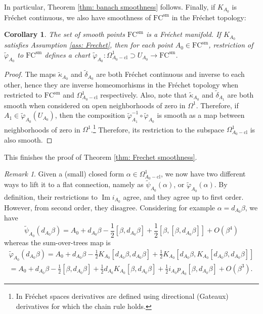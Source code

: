 \documentclass[11pt,a4paper]{amsart}
\theoremstyle{plain} %
\newtheorem{cor}[thm]{Corollary}
\theoremstyle{definition}
\theoremstyle{remark}
\newtheorem{rem}[thm]{Remark}
\newcommand{\dd}{d}
\newcommand{\mr}{\mathrm}
\newcommand{\til}{\widetilde}
\newcommand{\FC}{\mathrm{FC}}
\begin{document}
In particular, Theorem \ref{thm: banach smoothness} follows. 
Finally, if $K_{A_0}$ is Fr\'echet continuous, we also have smoothness of $\FC^\mr{sm}$ in the Fr\'echet topology:   
\begin{cor}\label{cor: Frechet smoothness}
    The set of smooth points $\FC^{\mr{sm}}$ is a Fr\'echet manifold. If $K_{A_0}$ satisfies Assumption \ref{ass: Frechet}, then for each point $A_0 \in \FC^{\mr{sm}}$, restriction of $\til{\varphi}_{A_0}$ to $\FC^\mr{sm}$ defines a chart 
    $\til\varphi_{A_0}\colon \Omega^1_{A_0-\mr{cl}} \supset U_{A_0} \to \FC^\mr{sm}$.
\end{cor}
\begin{proof}
    The maps $\til\kappa_{A_0}$ and $\til\delta_{A_0}$ are both Fr\'echet continuous and inverse to each other, hence they are inverse homeomorhisms in the Fr\'echet topology when restricted to $\FC^\mr{sm}$ and $\Omega^1_{A_0-\mr{cl}}$ respectively. Also, note that $\til{\kappa}_{A_0}$ and $\til\delta_{A_1}$ are both smooth when considered on open neighborhoods of zero in $\Omega^1$. Therefore, if $A_1 \in \til\varphi_{A_0}(U_{A_0})$, then the composition $\til\varphi^{-1}_{A_1} \circ \til\varphi_{A_0}$ is smooth as a map between neighborhoods of zero in $\Omega^1$.\footnote{In Fr\'echet spaces derivatives are defined using directional (Gateaux) derivatives for which the chain rule holds.} Therefore, its restriction to the subspace $\Omega^1_{A_0-\mr{cl}}$ is also smooth.  
\end{proof}
This finishes the proof of Theorem \ref{thm: Frechet smoothness}. 
\begin{rem}
    Given a (small) closed form $\alpha \in \Omega^1_{A_0-\mr{cl}}$, we now have two different ways to lift it to a flat connection, namely as $\til{\psi}_{A_0}(\alpha)$, or $\til{\varphi}_{A_0}(\alpha)$. By definition, their restrictions to $\operatorname{Im} i_{A_0}$ agree, and they agree up to first order. However, from second order, they disagree. Considering for example $\alpha= \dd_{A_0}\beta$, we have 
    $$\til\psi_{A_0}(\dd_{A_0}\beta) = A_0 + \dd_{A_0}\beta -\frac{1}{2}[\beta,d_{A_0}\beta] + \frac12[\beta,[\beta,\dd_{A_0}\beta]] + O(\beta^4)$$ 
    whereas the sum-over-trees map is 
    \begin{multline*}
        \til{\varphi}_{A_0}(\dd_{A_0}\beta) = A_0 + \dd_{A_0}\beta - \frac{1}{2}K_{A_0}[\dd_{A_0}\beta,\dd_{A_0}\beta] + \frac12K_{A_0}[\dd_{A_0}\beta, K_{A_0}[\dd_{A_0}\beta,\dd_{A_0}\beta]] \\ 
 = A_0 + \dd_{A_0}\beta - \frac12[\beta,d_{A_0}\beta] + \frac12 d_{A_0}K_{A_0}[\beta,d_{A_0}\beta] +\frac12 i_{A_0}p_{A_0}[\beta,d_{A_0}\beta] + O(\beta^3).
    \end{multline*}
\end{rem}
\end{document}
